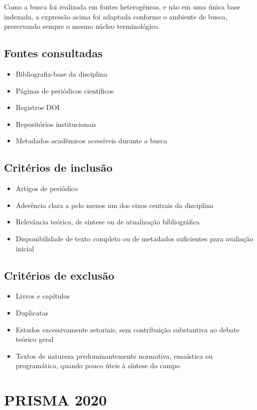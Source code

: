 \documentclass[12pt]{article}
\begin{document}
Como a busca foi realizada em fontes heterogêneas, e não em uma única base indexada, a expressão acima foi adaptada conforme o ambiente de busca, preservando sempre o mesmo núcleo terminológico.

\subsection{Fontes consultadas}
\label{sec:orgc0375a6}
\begin{itemize}
\item Bibliografia-base da disciplina
\item Páginas de periódicos científicos
\item Registros DOI
\item Repositórios institucionais
\item Metadados acadêmicos acessíveis durante a busca
\end{itemize}

\subsection{Critérios de inclusão}
\label{sec:org663fa94}
\begin{itemize}
\item Artigos de periódico
\item Aderência clara a pelo menos um dos eixos centrais da disciplina
\item Relevância teórica, de síntese ou de atualização bibliográfica
\item Disponibilidade de texto completo ou de metadados suficientes para avaliação inicial
\end{itemize}

\subsection{Critérios de exclusão}
\label{sec:org4961d98}
\begin{itemize}
\item Livros e capítulos
\item Duplicatas
\item Estudos excessivamente setoriais, sem contribuição substantiva ao debate teórico geral
\item Textos de natureza predominantemente normativa, ensaística ou programática, quando pouco úteis à síntese do campo
\end{itemize}

\section{PRISMA 2020}
\label{sec:org0c2ba6e}
\end{document}
